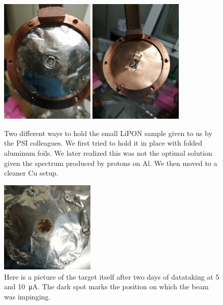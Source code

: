 \begin{refsection}
    \begin{figure}
        \centering
        \includegraphics[width = 0.4\textwidth]{Figures/X17/Dec2023/X17_Dec2023_AlTarget.jpeg}
        \includegraphics[width = 0.4\textwidth]{Figures/X17/Dec2023/X17_Dec2023_CuTarget.jpeg}
        \caption[Small LiPON target setup]{Two different ways to hold the small LiPON sample given to us by the PSI colleagues. We first tried to hold it in place with folded aluminum foils. We later realized this was not the optimal solution given the spectrum produced by protons on Al. We then moved to a cleaner Cu setup.}
        \label{fig:X17:target:LiPON:psi}
    \end{figure}
    \begin{figure}
        \centering

        \includegraphics[width = 0.4\textwidth]{Figures/X17/Dec2023/X17_Dec2023_AlTarget_burned.png}
        \caption[Small LiPON target]{Here is a picture of the target itself after two days of datataking at 5 and \SI{10}{\micro A}. The dark spot marks the position on which the beam was impinging.}
        \label{fig:X17:target:LiPON:psi}
    \end{figure}       


\end{refsection}
